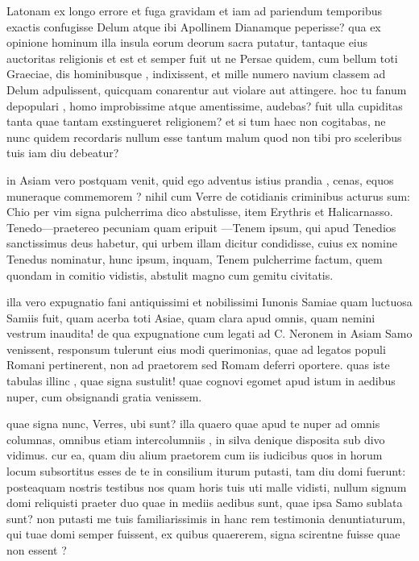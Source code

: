  Latonam ex longo errore et fuga gravidam et iam ad pariendum temporibus exactis confugisse Delum atque ibi Apollinem Dianamque peperisse? qua ex opinione hominum illa insula eorum deorum sacra putatur, tantaque eius auctoritas religionis et est et semper fuit ut ne Persae quidem, cum bellum toti Graeciae, dis hominibusque , indixissent, et mille numero navium classem ad Delum adpulissent, quicquam conarentur aut violare aut attingere. hoc tu fanum depopulari , homo improbissime atque amentissime, audebas? fuit ulla cupiditas tanta quae tantam exstingueret religionem? et si tum haec non cogitabas, ne nunc quidem recordaris nullum esse tantum malum quod non tibi pro sceleribus tuis iam diu debeatur?

 in Asiam vero postquam venit, quid ego adventus istius prandia , cenas, equos muneraque commemorem ? nihil cum Verre de cotidianis criminibus acturus sum: Chio per vim signa pulcherrima dico abstulisse, item Erythris et Halicarnasso. Tenedo—praetereo pecuniam quam eripuit —Tenem ipsum, qui apud Tenedios sanctissimus deus habetur, qui urbem illam dicitur condidisse, cuius ex nomine Tenedus nominatur, hunc ipsum, inquam, Tenem pulcherrime factum, quem quondam in comitio vidistis, abstulit magno cum gemitu civitatis.

 illa vero expugnatio fani antiquissimi et nobilissimi Iunonis Samiae quam luctuosa Samiis fuit, quam acerba toti Asiae, quam clara apud omnis, quam nemini vestrum inaudita! de qua expugnatione cum legati ad C. Neronem in Asiam Samo venissent, responsum tulerunt eius modi querimonias, quae ad legatos populi Romani pertinerent, non ad praetorem sed Romam deferri oportere. quas iste tabulas illinc , quae signa sustulit! quae cognovi egomet apud istum in aedibus nuper, cum obsignandi gratia venissem.

 quae signa nunc, Verres, ubi sunt? illa quaero quae apud te nuper ad omnis columnas, omnibus etiam intercolumniis , in silva denique disposita sub divo vidimus. cur ea, quam diu alium praetorem cum iis iudicibus quos in horum locum subsortitus esses de te in consilium iturum putasti, tam diu domi fuerunt: posteaquam nostris testibus nos quam horis tuis uti malle vidisti, nullum signum domi reliquisti praeter duo quae in mediis aedibus sunt, quae ipsa Samo sublata sunt? non putasti me tuis familiarissimis in hanc rem testimonia denuntiaturum, qui tuae domi semper fuissent, ex quibus quaererem, signa scirentne fuisse quae non essent ?

